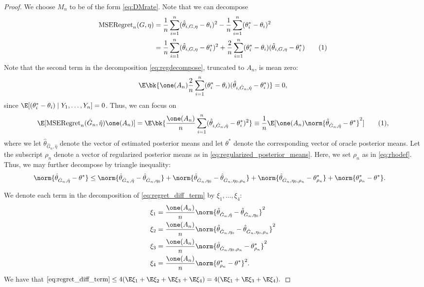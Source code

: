 \documentclass[12pt, reqno]{amsart}
\newcommand\numberthis{\addtocounter{equation}{1}\tag{\theequation}}
\newcommand{\hateta}{\hat\eta}
\newcommand{\reg}{\mathrm{MSERegret}_n}
\numberwithin{equation}{section}
\begin{document}
\begin{refsection}
\begin{appendices}
\begin{proof}
We choose $M_n$ to be of the form \eqref{eq:DMrate}. Note that we can decompose
\begin{align*}
\reg(G,\eta)
&= \frac{1}{n}\sum_{i=1}^n (\hat\theta_{i, G, \eta} - \theta_i)^2 - \frac{1}
{n}\sum_{i=1}^n (\theta^*_i - \theta_i)^2
\\
&= \frac{1}{n} \sum_{i=1}^n (\hat\theta_{i, G, \eta} - \theta^*_i)^2 + \frac{2}{n} \sum_
{i=1}^n (\theta^*_i - \theta_i)(\hat\theta_{i, G, \eta} - \theta^*_i)
\numberthis\label{eq:regdecompose}
\end{align*} 
Note that the second term in the decomposition
\eqref{eq:regdecompose}, truncated to $A_n$, is mean zero: \[
\E\bk{\one(A_n) \frac{2}{n} \sum_
{i=1}^n (\theta^*_i - \theta_i)(\hat\theta_{i, \hat G_n, \hateta} - \theta^*_i)} = 0,
\]
 since $\E[(\theta^*_i - \theta_i) \mid Y_{1},\ldots, Y_n] = 0$. Thus, we can
focus on \[
\E[\reg(\hat G_n,\hateta)\one(A_n)] = \E\bk{\frac{\one(A_n)}{n} \sum_{i=1}^n (\hat\theta_
{i, \hat G_n, \hateta} - \theta^*_i)^2} \equiv
\frac{1}{n}\E[\one(A_n) \norm{\hat\theta_{\hat G_n, \hateta} - \theta^*}^2] \numberthis
\label{eq:regret_diff_term},
\]
where we let $\hat\theta_{\hat G_n, \hateta}$ denote the vector of estimated posterior
means and let $\theta^*$ denote the corresponding vector of oracle posterior means. Let
the subscript $\rho_n$ denote a vector of regularized posterior means as in
\eqref{eq:regularized_posterior_means}. Here, we set $\rho_n$ as in \eqref{eq:rhodef}.  Thus, we may
further decompose
by triangle
inequality: \begin{align*}
\norm{\hat\theta_{\hat G_n, \hateta} - \theta^*} &\le
\norm{\hat\theta_{\hat G_n, \hateta} - \hat\theta_{\hat G_n, \eta_0}}
+ \norm{\hat\theta_{\hat G_n, \eta_0} - \hat\theta_{\hat G_n, \eta_0, \rho_n}}
+ \norm{\hat\theta_{\hat G_n, \eta_0, \rho_n} - \theta^*_{\rho_n}}
+ \norm{\theta^*_{\rho_n} - \theta^*}.
\end{align*}

We denote each term in the decomposition of \eqref{eq:regret_diff_term} by $\xi_1,\ldots,
\xi_4$: \begin{align}
\xi_1 &= \frac{\one(A_n)}{n} \norm{\hat\theta_{\hat G_n, \hateta} - \hat\theta_{\hat G_n, \eta_0}}^2
\\
\xi_2 &= \frac{\one(A_n)}{n} \norm{\hat\theta_{\hat G_n, \eta_0} - \hat\theta_{\hat G_n, \eta_0, \rho_n}}^2
\\
\xi_3 &= \frac{\one(A_n)}{n}\norm{\hat\theta_{\hat G_n, \eta_0, \rho_n} - \theta^*_{\rho_n}}^2 \\
\xi_4 &= \frac{\one(A_n)}{n}\norm{\theta^*_{\rho_n} - \theta^*}^2.
\end{align}
We have that $
\eqref{eq:regret_diff_term} \le 4 (\E\xi_1 + \E\xi_2 + \E\xi_3 + \E\xi_4) = 4 (\E\xi_1 + \E\xi_3 + \E\xi_4).$


\end{proof}
\end{appendices}
\end{refsection}
\end{document}
